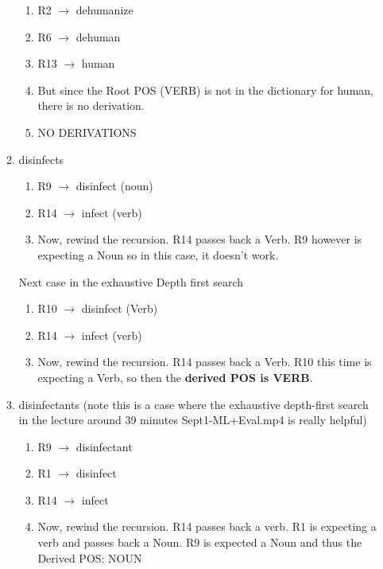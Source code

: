 \documentclass[11pt]{article}
\begin{document}
\begin{enumerate}
\begin{enumerate}
\begin{enumerate}
    \item R2 $\rightarrow$ dehumanize
    \item R6 $\rightarrow$ dehuman
    \item R13 $\rightarrow$ human
    \item But since the Root POS (VERB) is not in the dictionary for human, there is no derivation.
    \item NO DERIVATIONS
    
    \end{enumerate} 

\item disinfects 

    \begin{enumerate}
    
    \item R9 $\rightarrow$ disinfect (noun)
    \item R14 $\rightarrow$ infect (verb)
    \item Now, rewind the recursion. R14 passes back a Verb. R9 however is expecting a Noun so in this case, it doesn't work.
    
    \end{enumerate} 
    
	Next case in the exhaustive Depth first search    
    
    \begin{enumerate}
    
    \item R10 $\rightarrow$ disinfect (Verb)
    \item R14 $\rightarrow$ infect (verb)
    \item Now, rewind the recursion. R14 passes back a Verb. R10 this time is expecting a Verb, so then the \textbf{derived POS is VERB}.
    
    \end{enumerate} 

\item disinfectants (note this is a case where the exhaustive depth-first search in the lecture around 39 minutes Sept1-ML+Eval.mp4 is really helpful)

    \begin{enumerate}
    
    \item R9 $\rightarrow$ disinfectant
    \item R1 $\rightarrow$ disinfect
    \item R14 $\rightarrow$ infect
    \item Now, rewind the recursion. R14 passes back a verb. R1 is expecting a verb and passes back a Noun. R9 is expected a Noun and thus the Derived POS: NOUN
    

\end{enumerate}
\end{enumerate}
\end{enumerate}
\end{document}
